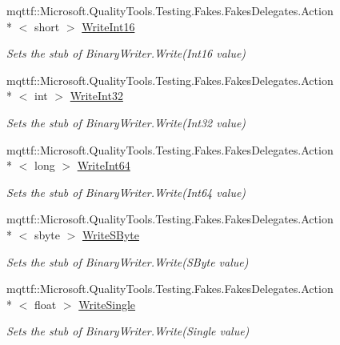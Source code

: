 \begin{DoxyCompactItemize}
mqttf\-::\-Microsoft.\-Quality\-Tools.\-Testing.\-Fakes.\-Fakes\-Delegates.\-Action\\*
$<$ short $>$ \hyperlink{class_system_1_1_i_o_1_1_fakes_1_1_stub_binary_writer_ac9ffdc9dda990a969fb6b9604ee9e88e}{Write\-Int16}
\begin{DoxyCompactList}\small\item\em Sets the stub of Binary\-Writer.\-Write(\-Int16 value)\end{DoxyCompactList}\item 
mqttf\-::\-Microsoft.\-Quality\-Tools.\-Testing.\-Fakes.\-Fakes\-Delegates.\-Action\\*
$<$ int $>$ \hyperlink{class_system_1_1_i_o_1_1_fakes_1_1_stub_binary_writer_ace5194839f1cff267435f04155024a5d}{Write\-Int32}
\begin{DoxyCompactList}\small\item\em Sets the stub of Binary\-Writer.\-Write(\-Int32 value)\end{DoxyCompactList}\item 
mqttf\-::\-Microsoft.\-Quality\-Tools.\-Testing.\-Fakes.\-Fakes\-Delegates.\-Action\\*
$<$ long $>$ \hyperlink{class_system_1_1_i_o_1_1_fakes_1_1_stub_binary_writer_a3ed5423f719f063820fe9f74170dd34f}{Write\-Int64}
\begin{DoxyCompactList}\small\item\em Sets the stub of Binary\-Writer.\-Write(\-Int64 value)\end{DoxyCompactList}\item 
mqttf\-::\-Microsoft.\-Quality\-Tools.\-Testing.\-Fakes.\-Fakes\-Delegates.\-Action\\*
$<$ sbyte $>$ \hyperlink{class_system_1_1_i_o_1_1_fakes_1_1_stub_binary_writer_a7ff1223f92522dd42e32fb2ef3104e25}{Write\-S\-Byte}
\begin{DoxyCompactList}\small\item\em Sets the stub of Binary\-Writer.\-Write(\-S\-Byte value)\end{DoxyCompactList}\item 
mqttf\-::\-Microsoft.\-Quality\-Tools.\-Testing.\-Fakes.\-Fakes\-Delegates.\-Action\\*
$<$ float $>$ \hyperlink{class_system_1_1_i_o_1_1_fakes_1_1_stub_binary_writer_ab9d673cb3df066bb4a235bb4f3e1d367}{Write\-Single}
\begin{DoxyCompactList}\small\item\em Sets the stub of Binary\-Writer.\-Write(\-Single value)\end{DoxyCompactList}\item 

\end{DoxyCompactItemize}
